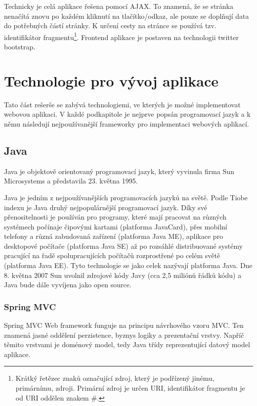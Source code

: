 Technicky je celá aplikace řešena pomocí AJAX. To znamená, že se stránka nenačítá znovu po každém kliknutí na tlačítko/odkaz, ale pouze se doplňují data do potřebných částí stránky. K určení cesty na stránce se používá tzv. identifikátor fragmentu\footnote{Krátký řetězec znaků označující zdroj, který je podřízený jinému, primárnímu, zdroji. Primární zdroj je určen URI, identifikátor fragmentu je od URI oddělen znakem \#.}. Frontend aplikace je postaven na technologii twitter bootstrap.

\section{Technologie pro vývoj aplikace}
Tato část rešerše se zabývá technologiemi, ve kterých je možné implementovat webovou aplikaci. V každé podkapitole je nejprve popsán programovací jazyk a k němu následují nejpoužívanější frameworky pro implementaci webových aplikací.
\subsection{Java}
Java je objektově orientovaný programovací jazyk, který vyvinula firma Sun Microsystems a představila 23. května 1995\cite{website:wiki:java}.

Java je jedním z nejpoužívanějších programovacích jazyků na světě. Podle Tiobe indexu je Java druhý nejpopulárnější programovací jazyk\cite{website:tobie}. Díky své přenositelnosti je používán pro programy, které mají pracovat na různých systémech počínaje čipovými kartami (platforma JavaCard), přes mobilní telefony a různá zabudovaná zařízení (platforma Java ME), aplikace pro desktopové počítače (platforma Java SE) až po rozsáhlé distribuované systémy pracující na řadě spolupracujících počítačů rozprostřené po celém světě (platforma Java EE). Tyto technologie se jako celek nazývají platforma Java. Dne 8. května 2007 Sun uvolnil zdrojové kódy Javy (cca 2,5 miliónů řádků kódu) a Java bude dále vyvíjena jako open source\cite{website:wiki:java}.
\subsubsection{Spring MVC}
Spring MVC Web framework funguje na principu návrhového vzoru MVC. Ten znamená jasné oddělení perzistence, byznys logiky a prezentační vrstvy. Napříč těmito vrstvami je doménový model, tedy Java třídy reprezentující datový model aplikace\cite{liu2006research}.

